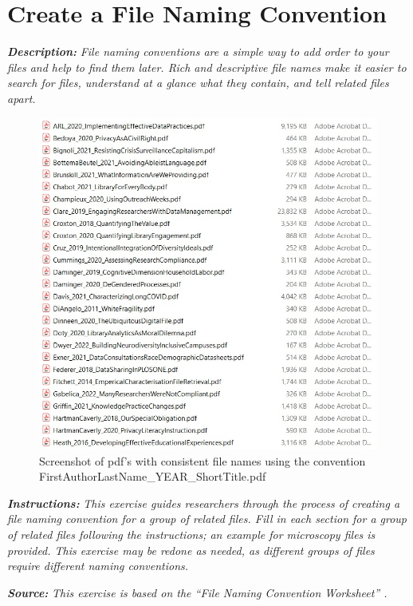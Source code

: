 \documentclass[
]{book}
\begin{document}
\hypertarget{file-naming}{%
\section{Create a File Naming Convention}\label{file-naming}}

\textbf{\emph{Description:}} \emph{File naming conventions are a simple way to add order to your files and help to find them later. Rich and descriptive file names make it easier to search for files, understand at a glance what they contain, and tell related files apart.}

\begin{figure}
\centering
\includegraphics{images/03_FileNaming.jpg}
\caption{Screenshot of pdf's with consistent file names using the convention FirstAuthorLastName\_YEAR\_ShortTitle.pdf}
\end{figure}

\textbf{\emph{Instructions:}} \emph{This exercise guides researchers through the process of creating a file naming convention for a group of related files. Fill in each section for a group of related files following the instructions; an example for microscopy files is provided. This exercise may be redone as needed, as different groups of files require different naming conventions.}

\textbf{\emph{Source:}} \emph{This exercise is based on the ``File Naming Convention Worksheet'' \citep{briney_file_2020}.}
\end{document}

